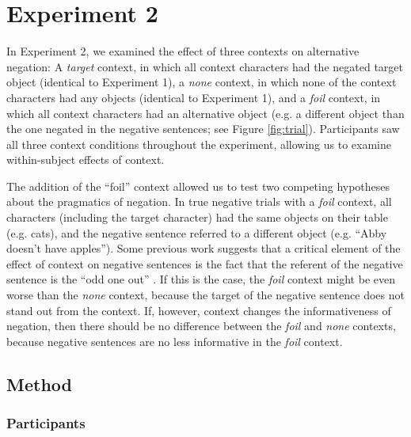 \documentclass[10pt,letterpaper]{article}
\begin{document}
\section{Experiment 2}

In Experiment 2, we examined the effect of three contexts on alternative negation: A \emph{target} context, in which all context characters had the negated target object (identical to Experiment 1), a \emph{none} context, in which none of the context characters had any objects (identical to Experiment 1), and a \emph{foil} context, in which all context characters had an alternative object (e.g. a different object than the one negated in the negative sentences; see Figure \ref{fig:trial}).  Participants saw all three context conditions throughout the experiment, allowing us to examine within-subject effects of context.  

The addition of the ``foil'' context allowed us to test two competing hypotheses about the pragmatics of negation.  In true negative trials with a \emph{foil} context, all characters (including the target character) had the same objects on their table (e.g. cats), and the negative sentence referred to a different object (e.g. ``Abby doesn't have apples'').  Some previous work suggests that a critical element of the effect of context on negative sentences is the fact that the referent of the negative sentence is the ``odd one out'' \cite{wason1965}.  If this is the case, the \emph{foil} context might be even worse than the \emph{none} context, because the target of the negative sentence does not stand out from the context.  If, however, context changes the informativeness of negation, then there should be no difference between the \emph{foil} and \emph{none} contexts, because negative sentences are no less informative in the \emph{foil} context.  


\subsection{Method}

\subsubsection{Participants}
\end{document}
